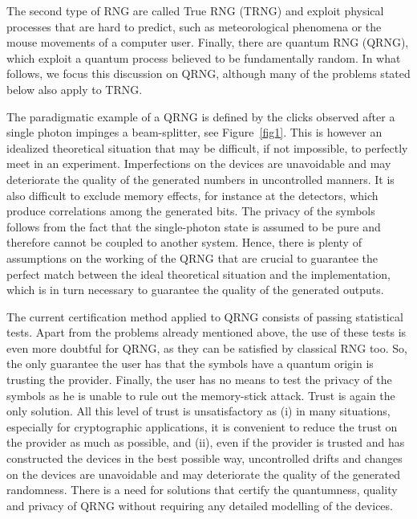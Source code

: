 \documentclass[11pt,a4paper]{article}
\begin{document}
The second type of RNG are called True RNG (TRNG) and exploit
physical processes that are hard to predict, such as
meteorological phenomena or the
mouse movements of a computer user. %
Finally, there are quantum RNG (QRNG), which exploit a quantum
process believed to be fundamentally random. %
In what follows, we focus this discussion on QRNG, although many of the problems stated below also apply to TRNG.

The paradigmatic example of a QRNG is defined by the clicks
observed after a single photon impinges a beam-splitter, see
Figure~\ref{fig1}. This is however an idealized theoretical
situation that may be difficult, if not impossible, to perfectly
meet in an experiment. Imperfections on the devices are
unavoidable and may deteriorate the quality of the generated
numbers in uncontrolled manners. It is also difficult to exclude
memory effects, for instance at the detectors, which produce correlations among the generated bits. The privacy of the
symbols follows from the fact that the single-photon state is
assumed to be pure and therefore cannot be coupled to another
system. Hence, there is plenty of assumptions on the working of the %
QRNG that are crucial to guarantee the
perfect match between the ideal theoretical situation and the
implementation, which is in turn
necessary to guarantee the quality of the generated outputs.

The current certification method applied to QRNG consists of passing
statistical tests. Apart from the problems already mentioned above, the use
of these tests is even more doubtful for QRNG, as they can be
satisfied by classical RNG too. So, the only guarantee the user
has that the symbols have a quantum origin is trusting the
provider. %
Finally, the user has no means to test the privacy of
the symbols %
as he is unable to rule out the memory-stick attack. Trust is again the
only solution. All this level of trust is unsatisfactory as
(i) in many situations, especially for cryptographic applications,
it is convenient to reduce the trust on the provider %
as much as possible, and (ii), even if the
provider is trusted and has constructed the devices in the best possible way, uncontrolled drifts and changes on the devices are unavoidable
and may deteriorate the quality of the generated randomness. There is
a need for solutions that certify the quantumness, %
quality and privacy of QRNG without requiring any detailed modelling of the devices.
\end{document}
